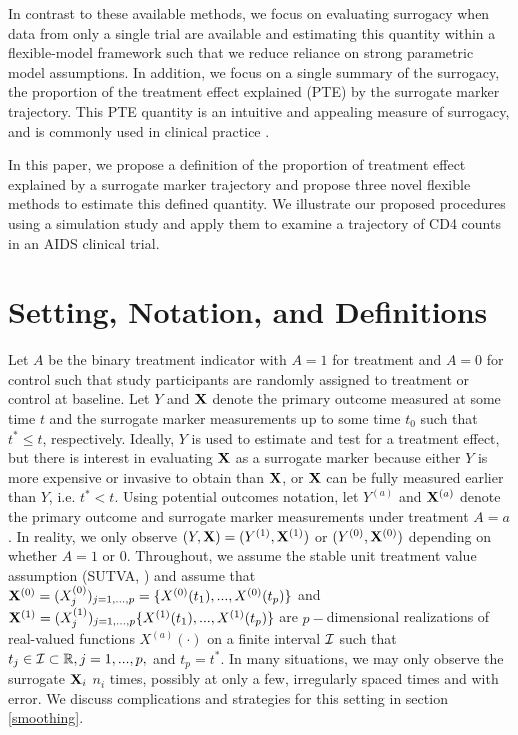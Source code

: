 \documentclass[useAMS,usenatbib,referee]{biom}
\def\Isc{{\cal I}}
\begin{document}
In contrast to these available methods, we focus on evaluating surrogacy when data from only a single trial are available and estimating this quantity within a flexible-model framework such that we reduce reliance on strong parametric model assumptions. In addition, we focus on a single summary of the surrogacy, the proportion of the treatment effect explained (PTE) by the surrogate marker trajectory. This PTE quantity is an intuitive and appealing measure of surrogacy, and is commonly used in clinical practice \citep{inker2016early,agyemang2018herpes,royce2017surrogate,chen2003proportion}. 

In this paper, we propose a definition of the proportion of treatment effect explained by a surrogate marker trajectory and propose three novel flexible methods to estimate this defined quantity. We illustrate our proposed procedures using a simulation study and apply them to examine a trajectory of CD4 counts in an AIDS clinical trial.

\section{Setting, Notation, and Definitions}\label{sec:1}

Let $A$ be the binary treatment indicator with $A=1$ for treatment and $A=0$ for control such that study participants are randomly assigned to treatment or control at baseline.  Let $Y$ and ${\bf X}$ denote the primary outcome measured at some time $t$ and the surrogate marker measurements up to some time $t_0$ such that $t^* \leq t$, respectively. Ideally, $Y$ is used to estimate and test for a treatment effect, but there is interest in evaluating ${\bf X}$ as a surrogate marker because either $Y$ is more expensive or invasive to obtain than ${\bf X}$, or ${\bf X}$ can be fully measured earlier than $Y$, i.e. $t^* < t$. Using potential outcomes notation, let $Y^{(a)}$ and ${\bf X}^{(a)}$ denote the primary outcome and surrogate marker measurements under treatment $A = a$. In reality, we only observe $(Y, {\bf X})=(Y^{(1)}, {\bf X}^{(1)})$ or $(Y^{(0)}, {\bf X}^{(0)})$ depending on whether $A=1$ or $0.$ Throughout, we assume the stable unit treatment value assumption (SUTVA, \citet{rosenbaum1983central}) and assume that ${\bf X}^{(0)} = (X^{(0)}_j)_{j=1,...,p} = \{X^{(0)}(t_1), ..., X^{(0)}(t_p)\}$ and ${\bf X}^{(1)} = (X^{(1)}_j)_{j=1,...,p} \{X^{(1)}(t_1), ..., X^{(1)}(t_p)\}$ are $p-$dimensional realizations of real-valued functions $X^{(a)}(\cdot)$ on a finite interval $\Isc$ such that $t_j \in \Isc \subset \mathbb{R}, j = 1, ..., p,$ and $t_p = t^*$. In many situations, we may only observe the surrogate ${\bf X}_i$ \(n_i\)
times, possibly at only a few, irregularly spaced times and with error. We discuss complications and strategies for this setting in section \ref{smoothing}.
\end{document}
